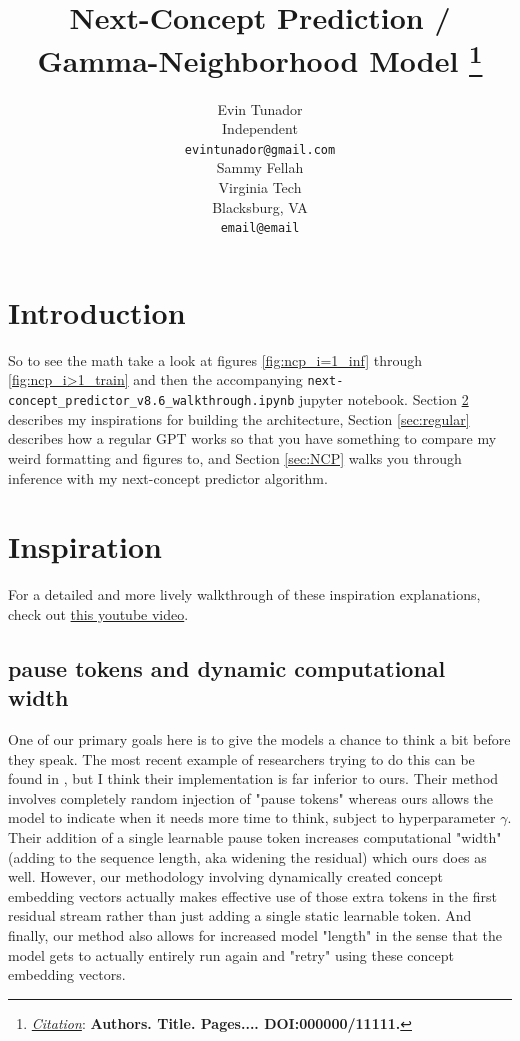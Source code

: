 \documentclass{article}
\title{Next-Concept Prediction / Gamma-Neighborhood Model
\thanks{\textit{\underline{Citation}}: 
\textbf{Authors. Title. Pages.... DOI:000000/11111.}} 
}
\author{
  Evin Tunador \\
  Independent \\
  \texttt{evintunador@gmail.com} \\
   \And
  Sammy Fellah \\
  Virginia Tech \\
  Blacksburg, VA\\
  \texttt{email@email} \\
}
\begin{document}
\maketitle


\begin{abstract}
\end{abstract}




\section{Introduction}

So to see the math take a look at figures \ref{fig:ncp_i=1_inf} through \ref{fig:ncp_i>1_train} and then the accompanying \texttt{next-concept\_predictor\_v8.6\_walkthrough.ipynb} jupyter notebook. Section \ref{sec:inspo} describes my inspirations for building the architecture, Section \ref{sec:regular} describes how a regular GPT works so that you have something to compare my weird formatting and figures to, and Section \ref{sec:NCP} walks you through inference with my next-concept predictor algorithm.

\section{Inspiration}
\label{sec:inspo}

For a detailed and more lively walkthrough of these inspiration explanations, check out \hyperlink{https://youtu.be/Ipl4v_rp2_A}{this youtube video}.\par

\subsection{pause tokens and dynamic computational width}
One of our primary goals here is to give the models a chance to think a bit before they speak. 
The most recent example of researchers trying to do this can be found in \cite{goyal2023think}, but I think their implementation is far inferior to ours.
Their method involves completely random injection of "pause tokens" whereas ours allows the model to indicate when it needs more time to think, subject to hyperparameter $\gamma$.
Their addition of a single learnable pause token increases computational "width" (adding to the sequence length, aka widening the residual) which ours does as well.
However, our methodology involving dynamically created concept embedding vectors actually makes effective use of those extra tokens in the first residual stream rather than just adding a single static learnable token.
And finally, our method also allows for increased model "length" in the sense that the model gets to actually entirely run again and "retry" using these concept embedding vectors. \par
\end{document}
